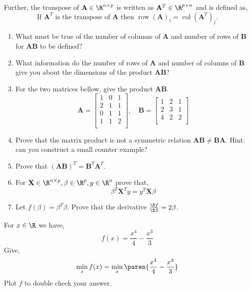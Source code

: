 \documentclass{homework}
\DeclareMathOperator{\row}{row}
\DeclareMathOperator{\col}{col}
\begin{document}
Further, the transpose of $\mathbf{A} \in \R^{n\times p}$ is written as $\mathbf{A}^T \in \R^{p\times n}$ and is defined as,
\[
  \text{If } \mathbf{A}^T \text{ is the transpose of } \mathbf{A} \text{ then } \row(\mathbf{A})_i = \col(\mathbf{A}^T)_j.
\]
\begin{enumerate}[label=(\alph*)]
  \item What must be true of the number of columns of $\mathbf{A}$ and number of rows of $\mathbf{B}$ for $\mathbf{AB}$ to be defined?


  \item What information do the number of rows of $\mathbf{A}$ and number of columns of $\mathbf{B}$ give you about the dimensions of the product $\mathbf{AB}$?


  \item For the two matrices bellow, give the product $\mathbf{AB}$.
        \[
          \mathbf{A} = \begin{bmatrix} 1 & 0 & 1 \\   2 & 1 & 1 \\   0 & 1 & 1 \\   1 & 1 & 2 \\   \end{bmatrix}, \quad
          \mathbf{B} = \begin{bmatrix} 1 & 2 & 1 \\   2 & 3 & 1 \\   4 & 2 & 2 \\   \end{bmatrix}
        \]
  \item Prove that the matrix product is not a symmetric relation \ie $\mathbf{AB} \neq \mathbf{BA}$.  Hint: can you construct a small counter example?
  \item Prove that $\mathbf{(AB)}^T = \mathbf{B}^T\mathbf{A}^T$.

  \item For $\mathbf{X} \in \R^{n\times p}, \beta \in \R^p, y \in \R^n$ prove that,
        \[
          \beta^T\mathbf{X}^Ty = y^T\mathbf{X}\beta
        \]
  \item Let $f(\beta) = \beta^T\beta$. Prove that the derivative $\frac{\D f}{\D \beta} = 2\beta$.
\end{enumerate}
\question For $x \in \R$ we have,
\[
  f(x) = \frac{x^4}{4} - \frac{x^3}{3}
\]
Give,
\[
  \min_xf(x) = \min_x\paren{\frac{x^4}{4} - \frac{x^3}{3}}
\]
Plot $f$ to double check your answer.
\end{document}
